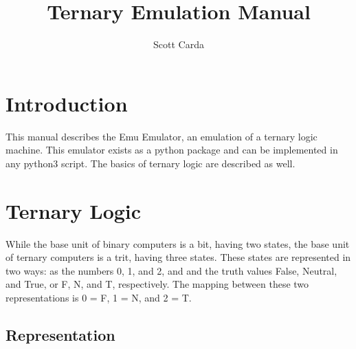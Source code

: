 \documentclass[12pt]{article}
\begin{document}


\title{Ternary Emulation Manual}
\date{}
\author{Scott Carda}

\maketitle
\newpage


\tableofcontents
\newpage


\section{Introduction} \label{sec:Intro}

This manual describes the Emu Emulator, an emulation of a ternary logic machine. This emulator
exists as a python package and can be implemented in any python3 script. The basics of ternary
logic are described as well. 

\section{Ternary Logic} \label{sec:Logic}

While the base unit of binary computers is a bit, having two states, the base unit of ternary
computers is a trit, having three states. These states are represented in two ways: as the
numbers 0, 1, and 2, and and the truth values False, Neutral, and True, or F, N, and T,
respectively. The mapping between these two representations is 0 = F, 1 = N, and 2 = T.

\subsection{Representation}
\end{document}
